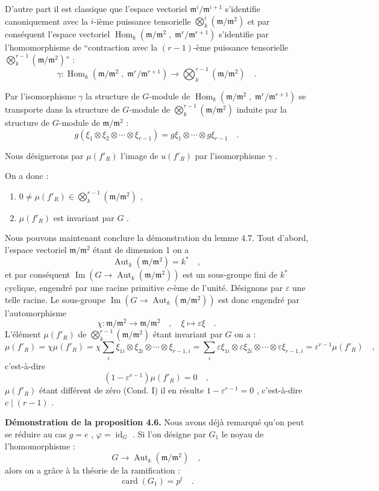 \documentclass[11pt]{article}
\providecommand{\fm}{\mathfrak{m}}
\DeclareMathOperator{\Hom}{Hom}
\providecommand{\id}{\operatorname{id}}
\providecommand{\Hom}{\operatorname{Hom}}
\providecommand{\id}{\operatorname{id}}
\providecommand{\id}{\operatorname{id}}
\providecommand{\Aut}{\operatorname{Aut}}
\providecommand{\id}{\operatorname{id}}
\providecommand{\id}{\operatorname{id}}
\providecommand{\im}{\operatorname{Im}}
\providecommand{\fm}{\mathfrak m}
\providecommand{\card}{\operatorname{card}}
\providecommand{\im}{\operatorname{im}}
\providecommand{\Aut}{\operatorname{Aut}}
\providecommand{\Hom}{\operatorname{Hom}}
\providecommand{\id}{\operatorname{id}}
\begin{document}
D'autre part il est classique que l'espace vectoriel $\fm^i/\fm^{i+1}$ s'identifie canoniquement avec la $i$-ième puissance tensorielle $\bigotimes_k^i (\fm/\fm^2)$ et par conséquent l'espace vectoriel $\Hom_k(\fm/\fm^2 \; , \; \fm^r/\fm^{r+1})$ s'identifie par l'homomorphisme de ``contraction avec la $(r-1)$-ème puissance tensorielle $\bigotimes_k^{r-1}(\fm/\fm^2)$'' :
\[
\gamma : \Hom_k(\fm/\fm^2 \; , \; \fm^r/\fm^{r+1}) \longrightarrow \bigotimes_k^{r-1}(\fm/\fm^2) \quad .
\]

Par l'isomorphisme $\gamma$ la structure de $G$-module de $\Hom_k(\fm/\fm^2 \; , \; \fm^r/\fm^{r+1})$ se transporte dans la structure de $G$-module de $\bigotimes_k^{r-1}(\fm/\fm^2)$ induite par la structure de $G$-module de $\fm/\fm^2$ :
\[
g(\xi_1 \otimes \xi_2 \otimes \cdots \otimes \xi_{r-1}) = g\xi_1 \otimes \cdots \otimes g\xi_{r-1} \quad .
\]

Nous désignerons par $\mu(f'_R)$ l'image de $u(f'_R)$ par l'isomorphisme $\gamma$ .

On a donc :
\begin{enumerate}
\item[I)] $0 \neq \mu(f'_R) \in \bigotimes_k^{r-1}(\fm/\fm^2)$ ,
\item[II)] $\mu(f'_R)$ est invariant par $G$ .
\end{enumerate}

Nous pouvons maintenant conclure la démonstration du lemme 4.7. Tout d'abord, l'espace vectoriel $\fm/\fm^2$ étant de dimension 1 on a
\[
\Aut_k(\fm/\fm^2) = k^* \quad ,
\]
et par conséquent $\im(G \longrightarrow \Aut_k(\fm/\fm^2))$ est un sous-groupe fini de $k^*$ cyclique, engendré par une racine primitive $c$-ème de l'unité. Désignons par $\varepsilon$ une telle racine. Le sous-groupe $\im(G \longrightarrow \Aut_k(\fm/\fm^2))$ est donc engendré par l'automorphisme
\[
\chi : \fm/\fm^2 \longrightarrow \fm/\fm^2 \quad , \quad \xi \longmapsto \varepsilon\xi \quad .
\]
L'élément $\mu(f'_R)$ de $\bigotimes_k^{r-1}(\fm/\fm^2)$ étant invariant par $G$ on a :
\[
\mu(f'_R) = \chi\mu(f'_R) = \chi\sum_i \xi_{1i} \otimes \xi_{2i} \otimes \cdots \otimes \xi_{r-1,i} = \sum_i \varepsilon\xi_{1i} \otimes \varepsilon\xi_{2i} \otimes \cdots \otimes \varepsilon\xi_{r-1,i} = \varepsilon^{r-1}\mu(f'_R) \quad ,
\]
c'est-à-dire
\[
(1 - \varepsilon^{r-1})\mu(f'_R) = 0 \quad ,
\]
$\mu(f'_R)$ étant différent de zéro (Cond. I) il en résulte $1 - \varepsilon^{r-1} = 0$ , c'est-à-dire $c \mid (r-1)$ .

\medskip

\noindent
\textbf{Démonstration de la proposition 4.6.} Nous avons déjà remarqué qu'on peut se réduire au cas $g = e$ , $\varphi = \id_G$ . Si l'on désigne par $G_1$ le noyau de l'homomorphisme :
\[
G \longrightarrow \Aut_k(\fm/\fm^2) \quad ,
\]
alors on a grâce à la théorie de la ramification :
\[
\card(G_1) = p^t \quad .
\]
\end{document}

